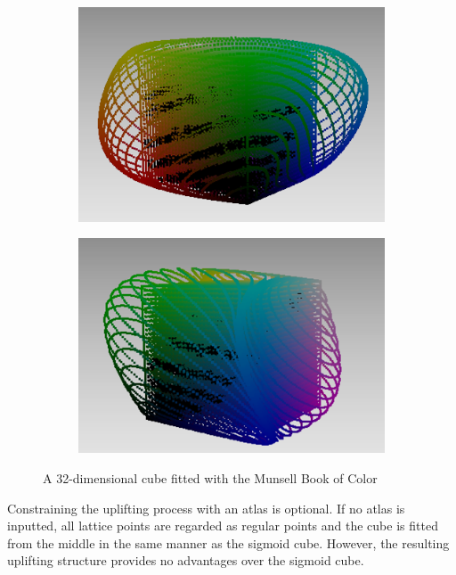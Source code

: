 \begin{figure}[t!]
\begin{subfigure}[t]{0.22\textwidth}
		\includegraphics[width=\linewidth]{img/seededCube_mcb3.png}
		\label{fig:seededCube_mcb3}
	\end{subfigure} \hspace{0.05em}
	\begin{subfigure}[t]{0.22\textwidth}
		\includegraphics[width=\linewidth]{img/seededCube_mcb4.png}
		\label{fig:seededCube_mcb4}
	\end{subfigure}
	\caption{A 32-dimensional cube fitted with the Munsell Book of Color}
	\label{fig:seededCubeMCB}
\end{figure}

Constraining the uplifting process with an atlas is optional. If no atlas is inputted, all lattice points are regarded as regular points and the cube is fitted from the middle in the same manner as the sigmoid cube. However, the resulting uplifting structure provides no advantages over the sigmoid cube.

